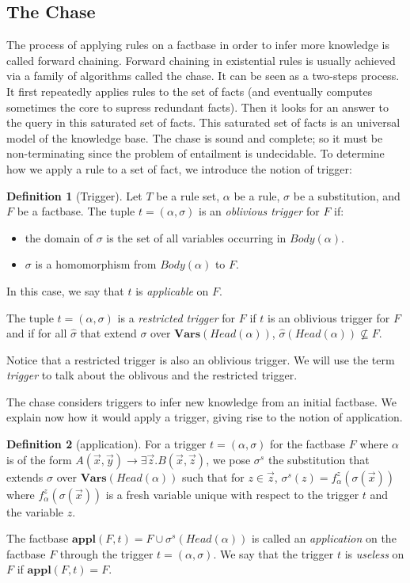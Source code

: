 \documentclass{article}
\theoremstyle{definition}
\newtheorem{definition}{Definition}[section]
\theoremstyle{remark}
\newcommand{\Vars}{\textbf{Vars}}
\newcommand{\Appl}{\textbf{appl}}
\begin{document}
\subsection{The Chase}

The process of applying rules on a factbase in order to infer more knowledge is called forward chaining.   Forward  chaining  in  existential  rules  is  usually achieved  via  a  family  of  algorithms  called the  chase. It can be seen as a two-steps process. It first repeatedly applies rules to the set of facts (and eventually computes sometimes the core to supress redundant facts). Then it looks for an answer to the query in this saturated set of facts. This saturated set of facts is an universal model of the knowledge base. The chase is sound and complete; so it must be non-terminating since the problem of entailment is undecidable. To determine how we apply a rule to a set of fact, we introduce the notion of trigger:

\begin{definition}[Trigger]
Let $T$ be a rule set, $\alpha$ be a rule, $\sigma$ be a substitution, and $F$ be a factbase. The tuple $t = (\alpha,\sigma)$ is an \emph{oblivious trigger} for $F$ if: 
\begin{itemize}
\item the domain of $\sigma$ is the set of all variables occurring in $Body(\alpha)$.
\item $\sigma$ is a homomorphism from $Body(\alpha)$ to $F$.
\end{itemize}
In this case, we say that $t$ is \emph{applicable} on $F$.

The tuple $t = (\alpha,\sigma)$ is a \emph{restricted trigger} for $F$ if $t$ is an oblivious trigger for $F$ and if for all $\hat \sigma$ that extend $\sigma$ over $\Vars(\textit{Head}(\alpha))$, $\hat \sigma(Head(\alpha)) \nsubseteq F$.
\end{definition} 



Notice that a restricted trigger is also an oblivious trigger. We will use the term \emph{trigger} to talk about the oblivous and the restricted trigger.

The chase considers triggers to infer new knowledge from an initial factbase. We explain now how it would apply a trigger, giving rise to the notion of application. 

\begin{definition}[application]
For a trigger $t = (\alpha,\sigma)$ for the factbase $F$ where $\alpha$ is of the form $A(\vec x,\vec y) \rightarrow \exists \vec z. B(\vec x,\vec z)$, we pose \emph{$\sigma^s$} the substitution that extends $\sigma$ over $\Vars(\textit{Head}(\alpha))$ such that for $z \in \vec z$, $\sigma^s(z) = f^z_\alpha(\sigma(\vec x))$ where $f^z_\alpha(\sigma(\vec x))$ is a fresh variable unique with respect to the trigger $t$ and the variable $z$.

The factbase $\Appl(F,t)=F \cup \sigma^s(\textit{Head}(\alpha))$ is called an \emph{application} on the factbase $F$ through the trigger $t = (\alpha,\sigma)$. We say that the trigger $t$ is \emph{useless} on $F$ if $\Appl(F,t) = F$.
\end{definition}
\end{document}
